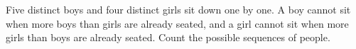 Five distinct boys and four distinct girls sit down one by one. A boy cannot sit when more boys than girls are already seated, and a girl cannot sit when more girls than boys are already seated. Count the possible sequences of people.
